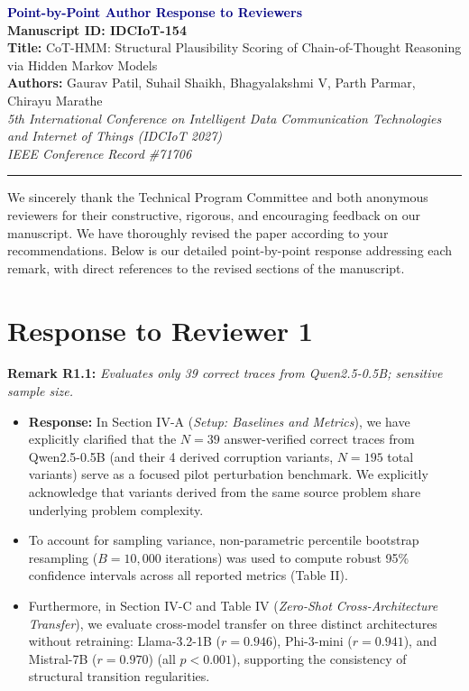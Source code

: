 \documentclass[11pt,a4paper]{article}
\begin{document}
\begin{center}
    {\Large \textbf{\textcolor{navy}{Point-by-Point Author Response to Reviewers}}}\\[6pt]
    \textbf{Manuscript ID: IDCIoT-154}\\[3pt]
    \textbf{Title:} CoT-HMM: Structural Plausibility Scoring of Chain-of-Thought Reasoning via Hidden Markov Models\\[3pt]
    \textbf{Authors:} Gaurav Patil, Suhail Shaikh, Bhagyalakshmi V, Parth Parmar, Chirayu Marathe\\[3pt]
    \textit{5th International Conference on Intelligent Data Communication Technologies and Internet of Things (IDCIoT 2027)}\\[2pt]
    \textit{IEEE Conference Record \#71706}
\end{center}

\vspace{10pt}
\hrule
\vspace{12pt}

We sincerely thank the Technical Program Committee and both anonymous reviewers for their constructive, rigorous, and encouraging feedback on our manuscript. We have thoroughly revised the paper according to your recommendations. Below is our detailed point-by-point response addressing each remark, with direct references to the revised sections of the manuscript.

\section*{Response to Reviewer 1}

\noindent\textbf{Remark R1.1:} \textit{Evaluates only 39 correct traces from Qwen2.5-0.5B; sensitive sample size.}
\begin{itemize}[leftmargin=18pt]
    \item \textbf{Response:} In Section IV-A (\textit{Setup: Baselines and Metrics}), we have explicitly clarified that the $N=39$ answer-verified correct traces from Qwen2.5-0.5B (and their 4 derived corruption variants, $N=195$ total variants) serve as a focused pilot perturbation benchmark. We explicitly acknowledge that variants derived from the same source problem share underlying problem complexity.
    \item To account for sampling variance, non-parametric percentile bootstrap resampling ($B=10{,}000$ iterations) was used to compute robust 95\% confidence intervals across all reported metrics (Table II).
    \item Furthermore, in Section IV-C and Table IV (\textit{Zero-Shot Cross-Architecture Transfer}), we evaluate cross-model transfer on three distinct architectures without retraining: Llama-3.2-1B ($r=0.946$), Phi-3-mini ($r=0.941$), and Mistral-7B ($r=0.970$) (all $p < 0.001$), supporting the consistency of structural transition regularities.
\end{itemize}
\end{document}
